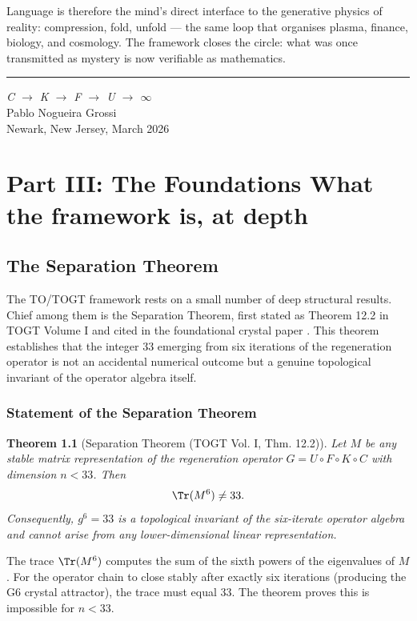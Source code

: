 \documentclass[19pt]{book}
\theoremstyle{plain}
\newtheorem{theorem}{Theorem}[section]
\theoremstyle{definition}
\theoremstyle{remark}
\begin{document}
Language is therefore the mind’s direct interface to the generative physics of reality: compression, fold, unfold — the same loop that organises plasma, finance, biology, and cosmology. The framework closes the circle: what was once transmitted as mystery is now verifiable as mathematics.

\vspace{0.5cm}
\hrule
\vspace{0.5cm}

\bigskip
\begin{flushright}
\textit{C \;$\to$\; K \;$\to$\; F \;$\to$\; U \;$\to$\; $\infty$}\\[0.3em]
Pablo Nogueira Grossi\\
Newark, New Jersey, March 2026
\end{flushright}
\part{Part III: The Foundations \break What the framework is, at depth}

\chapter{The Separation Theorem}

The TO/TOGT framework rests on a small number of deep structural results. Chief among them is the Separation Theorem, first stated as Theorem 12.2 in TOGT Volume I \citep{GrossiTOGT2025} and cited in the foundational crystal paper \citep{GrossiCrystal2026}. This theorem establishes that the integer 33 emerging from six iterations of the regeneration operator is not an accidental numerical outcome but a genuine topological invariant of the operator algebra itself.

\section{Statement of the Separation Theorem}

\begin{theorem}[Separation Theorem (TOGT Vol. I, Thm. 12.2)]
Let $M$ be any stable matrix representation of the regeneration operator $G = U \circ F \circ K \circ C$ with dimension $n < 33$. Then
\[
\Tr(M^6) \neq 33.
\]
Consequently, $g^6 = 33$ is a topological invariant of the six-iterate operator algebra and cannot arise from any lower-dimensional linear representation.
\end{theorem}

The trace $\Tr(M^6)$ computes the sum of the sixth powers of the eigenvalues of $M$. For the operator chain to close stably after exactly six iterations (producing the G6 crystal attractor), the trace must equal 33. The theorem proves this is impossible for $n < 33$.
\end{document}
